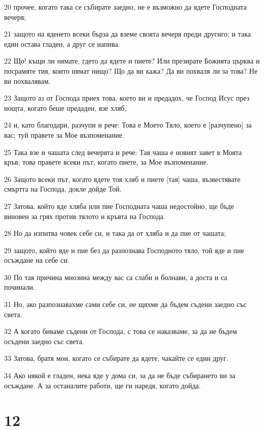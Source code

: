 \par 20 прочее, когато така се събирате заедно, не е възможно да ядете Господната вечеря;
\par 21 защото на яденето всеки бърза да вземе своята вечеря преди другиго; и така един остава гладен, а друг се напива.
\par 22 Що! къщи ли нямате, гдето да ядете и пиете? Или презирате Божията църква и посрамяте тия, които нямат нищо? Що да ви кажа? Да ви похваля ли за това? Не ви похвалявам.
\par 23 Защото аз от Господа приех това, което ви и предадох, че Господ Исус през нощта, когато беше предаден, взе хляб,
\par 24 и, като благодари, разчупи и рече: Това е Моето Тяло, което е [разчупено] за вас; туй правете за Мое възпоменание.
\par 25 Така взе и чашата след вечерята и рече: Тая чаша е новият завет в Моята кръв; това правете всеки път, когато пиете, за Мое възпоменание.
\par 26 Защото всеки път, когато ядете тоя хляб и пиете [тая] чаша, възвестявате смъртта на Господа, докле дойде Той.
\par 27 Затова, който яде хляба или пие Господната чаша недостойно, ще бъде виновен за грях против тялото и кръвта на Господа.
\par 28 Но да изпитва човек себе си, и така да от хляба и да пие от чашата;
\par 29 защото, който яде и пие без да разпознава Господното тяло, той яде и пие осъждане на себе си.
\par 30 По тая причина мнозина между вас са слаби и болнави, а доста и са починали.
\par 31 Но, ако разпознавахме сами себе си, не щяхме да бъдем съдени заедно със света.
\par 32 А когато биваме съдени от Господа, с това се наказваме, за да не бъдем осъдени заедно със света.
\par 33 Затова, братя мои, когато се събирате да ядете, чакайте се един друг.
\par 34 Ако някой е гладен, нека яде у дома си, за да не бъде събирането ви за осъждане. А за останалите работи, ще ги наредя, когато дойда.

\chapter{12}

